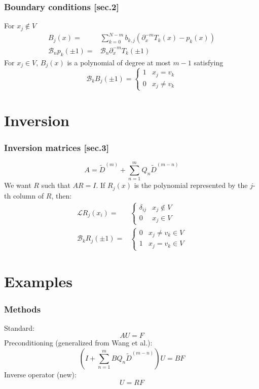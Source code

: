 \documentclass{beamer}
\begin{document}
\begin{frame}
\frametitle{Boundary conditions [sec.2]}
For $x_j \notin V$
\begin{align*}
B_j(x) = & \sum_{k=0}^{N-m} b_{k,j} \left ( \partial_x^{-m} T_k(x) - p_{k}(x) \right ) \\
\mathcal{B}_n p_{k}(\pm 1) = & \mathcal{B}_n \partial_x^{-m} T_k(\pm 1)
\end{align*}
For $x_j \in V$, $B_j(x)$ is a polynomial of degree at most $m-1$ satisfying
\begin{equation*}
\mathcal{B}_k B_j(\pm1) = \begin{cases} 1 & x_j = v_k \\ 0 & x_j \neq v_k \end{cases}
\end{equation*}
\end{frame}

\section{Inversion}

\begin{frame}
\frametitle{Inversion matrices [sec.3]}
\begin{equation*}
A = \tilde{D}^{(m)} + \sum_{n=1}^m Q_n \tilde{D}^{(m-n)}
\end{equation*}
We want $R$ such that $AR = I$.
If $R_j(x)$ is the polynomial represented by the $j$-th column of $R$, then:
\begin{align*}
\mathcal{L} R_j(x_i) = & \begin{cases} \delta_{ij} & x_j \notin V \\ 0 & x_j \in V \end{cases} \\
\mathcal{B}_k R_j(\pm 1) = & \begin{cases} 0 & x_j \neq v_k \in V \\ 1 & x_j = v_k \in V \end{cases}
\end{align*}
\end{frame}



\section{Examples}

\begin{frame}
\frametitle{Methods}
Standard:
\begin{equation*}
A U = F
\end{equation*}
Preconditioning (generalized from Wang et al.):
\begin{equation*}
\left ( I + \sum_{n=1}^m B Q_n \tilde{D}^{(m-n)} \right ) U = B F
\end{equation*}
Inverse operator (new):
\begin{equation*}
U = R F
\end{equation*}
\end{frame}
\end{document}

